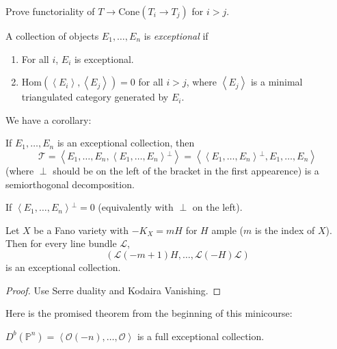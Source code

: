 \begin{exercise}
\label{exercise-functoriality-and-cone}
Prove functoriality of $T \to \text{Cone}(T_i
\to T_j)$ for $i>j$.
\end{exercise}

\begin{definition}
\label{dcos-label-028}
A collection of objects $E_1,\ldots, E_n$ is
{\it exceptional} if
\begin{enumerate}
\item For all $i$, $E_i$ is exceptional.
\item
$\text{Hom}(\left\langle{}E_i\right\rangle{},
\left\langle{}E_j\right\rangle{})
=0$
for all $i>j$, where
$\left\langle{}E_j\right\rangle{}$ is a minimal triangulated
category generated by $E_i$.
\end{enumerate}
\end{definition}

We have a corollary:

\begin{corollary}
\label{dcos-label-029}
If $E_1,\ldots,E_n$ is an exceptional
collection, then
$$
\mathcal{T}=\left\langle{}E_1,\ldots,E_n,\left\langle{}E_1,
\ldots,E_n\right\rangle{}^\perp\right\rangle{}
=\left\langle{}\left\langle{}E_1,\ldots,E_n\right\rangle{}^\perp,E_1,
\ldots,E_n\right\rangle{}
$$
(where $\perp$ should be on the left of the
bracket in the first appearence) is a
semiorthogonal decomposition.
\end{corollary}

\begin{definition}
\label{dcos-label-033}
If $\left\langle{}E_1,\ldots,E_n\right\rangle{}^\perp=0$
(equivalently with $\perp$ on the left).
\end{definition}

\begin{exercise}
\label{dcos-label-030}
Let $X$ be a Fano variety with $-K_X=mH$ for
$H$ ample ($m$ is the index of $X$). Then for
every line bundle $\mathcal{L}$,
$$
(\mathcal{L}(-m+1)H,\ldots,\mathcal{L}(-H)
\mathcal{L})
$$
is an exceptional collection.
\end{exercise}

\begin{proof}
Use Serre duality and Kodaira Vanishing.
\end{proof}

\medskip\noindent
Here is the promised theorem from the
beginning of this minicourse:

\begin{theorem}[Beilinson]
\label{theorem-Beilinson}
$D^b(\mathbb{P}^n)=\left\langle{}\mathcal{O}(-n),
\ldots,\mathcal{O}\right\rangle{}$
is a full exceptional collection.
\end{theorem}

